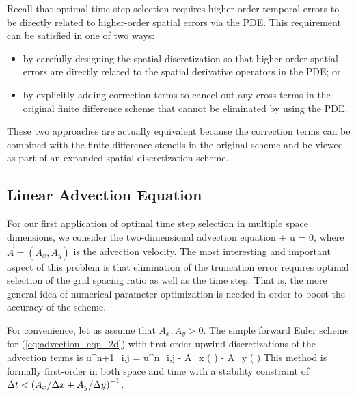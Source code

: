 \documentclass[fleqn,12pt,twoside]{article}
\begin{document}
Recall that optimal time step selection requires higher-order temporal 
errors to be directly related to higher-order spatial errors via the PDE.  
This requirement can be satisfied in one of two ways:
\begin{itemize}
\item by carefully designing the spatial discretization so that 
      higher-order spatial errors are directly related to the spatial 
      derivative operators in the PDE; or
\item by explicitly adding correction terms to cancel out any cross-terms 
      in the original finite difference scheme that cannot be eliminated 
      by using the PDE.
\end{itemize}
These two approaches are actually equivalent because the correction terms 
can be combined with the finite difference stencils in the original scheme 
and be viewed as part of an expanded spatial discretization scheme. 


\subsection{Linear Advection Equation}
For our first application of optimal time step selection in multiple
space dimensions, we consider the two-dimensional advection
equation
\beq
   +  \cdot \nabla u = 0,
  \label{eq:advection_eqn_2d}
\eeq
where $\vec{A} = (A_x, A_y)$ is the advection velocity.  
The most interesting and important aspect of this problem is that elimination 
of the truncation error requires optimal selection of the grid spacing ratio 
as well as the time step.  That is, the more general idea of numerical 
parameter optimization is needed in order to boost the accuracy of the scheme.

For convenience, let us assume that $A_x, A_y > 0$.  The simple forward Euler 
scheme for (\ref{eq:advection_eqn_2d}) with first-order upwind discretizations 
of the advection terms is 
\beq
  u^{n+1}_{i,j} = u^{n}_{i,j}
  - A_x \dt \left(  \right)
  - A_y \dt \left(  \right)
  \label{eq:advection_eqn_2d_FD_scheme}
\eeq
This method is formally first-order in both space and time with a 
stability constraint of $\Delta t < \left( A_x/\Delta x + A_y/\Delta y \right)^{-1}$.
\end{document}
